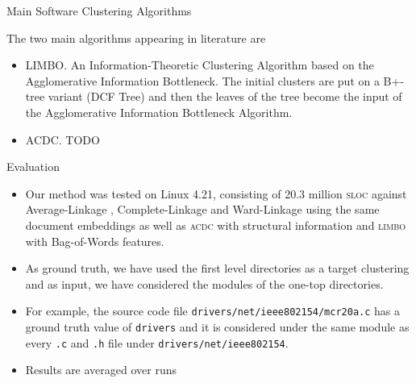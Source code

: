 \documentclass{beamer}
\begin{document}
\begin{frame}{Main Software Clustering Algorithms}

The two main algorithms appearing in literature \cite{maqbool_overview, large_study} are 

\begin{itemize}
    \item LIMBO. An Information-Theoretic Clustering Algorithm based on the Agglomerative Information Bottleneck. The initial clusters are put on a B+-tree variant (DCF Tree) and then the leaves of the tree become the input of the Agglomerative Information Bottleneck Algorithm. 

    \item ACDC. TODO
    
\end{itemize}


    
\end{frame}


\begin{frame}{Evaluation}
    
    \begin{itemize}
         \item Our method was tested on Linux 4.21, consisting of 20.3 million \textsc{sloc} against Average-Linkage \cite{average}, Complete-Linkage \cite{complete} and Ward-Linkage \cite{ward} using the same document embeddings as well as \textsc{acdc} with structural information \cite{acdc} and \textsc{limbo} \cite{limbo} with Bag-of-Words features. 
         \item As ground truth, we have used the first level directories as a target clustering and as input, we have considered the modules of the one-top directories. 
         \item For example, the source code file \texttt{drivers/net/ieee802154\-/mcr20a.c} has a ground truth value of \texttt{drivers} and it is considered under the same module as every \texttt{.c} and \texttt{.h} file under \texttt{drivers/net/ieee802154}.
         \item Results are averaged over runs
         
    \end{itemize}
    
\end{frame}
\end{document}
